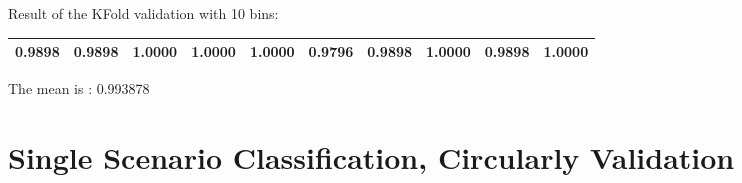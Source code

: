 Result of the KFold validation with 10 bins:
 {\def\arraystretch{1.3} 
 \begin{table}[H] 
\centering 
\begin{tabular}{|l |l |l |l |l |l |l |l |l |l |}  
\hline 
0.9898&
0.9898&
1.0000&
1.0000&
1.0000&
0.9796&
0.9898&
1.0000&
0.9898&
1.0000\\ \hline  

\end{tabular} 
\end{table} }

The mean is : 0.993878

\chapter{Single Scenario Classification, Circularly Validation}

